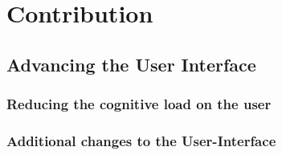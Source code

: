\chapter{Contribution}
\section{Advancing the User Interface}

	\subsection{Reducing the cognitive load on the user}
	
	\subsection{Additional changes to the User-Interface}
	
